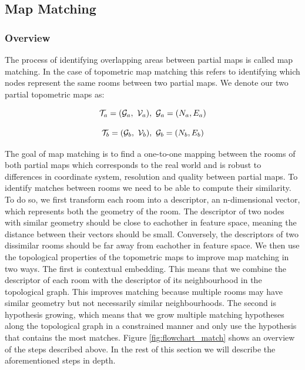 \subsection{Map Matching}

\subsubsection{Overview}
The process of identifying overlapping areas between partial maps is called map matching. In the case of topometric map matching this refers to identifying which nodes represent the same rooms between two partial maps. We denote our two partial topometric maps as:

\begin{equation}
    \label{eq:tmap_a}
    \topometricmap_a = (\mathcal{G}_a,\ \voxelgrid_a),\ \mathcal{G}_a=(N_a,E_a)
\end{equation}

\begin{equation}
    \label{eq:tmap_b}
    \topometricmap_b = (\mathcal{G}_b,\ \voxelgrid_b),\ \mathcal{G}_b=(N_b,E_b)
\end{equation}

The goal of map matching is to find a one-to-one mapping between the rooms of both partial maps which corresponds to the real world and is robust to differences in coordinate system, resolution and quality between partial maps. To identify matches between rooms we need to be able to compute their similarity. To do so, we first transform each room into a descriptor, an n-dimensional vector, which represents both the geometry of the room. The descriptor of two nodes with similar geometry should be close to eachother in feature space, meaning the distance between their vectors should be small. Conversely, the descriptors of two dissimilar rooms should be far away from eachother in feature space. We then use the topological properties of the topometric maps to improve map matching in two ways. The first is contextual embedding. This means that we combine the descriptor of each room with the descriptor of its neighbourhood in the topological graph. This improves matching because multiple rooms may have similar geometry but not necessarily similar neighbourhoods. The second is hypothesis growing, which means that we grow multiple matching hypotheses along the topological graph in a constrained manner and only use the hypothesis that contains the most matches. Figure \ref{fig:flowchart_match} shows an overview of the steps described above. In the rest of this section we will describe the aforementioned steps in depth.

